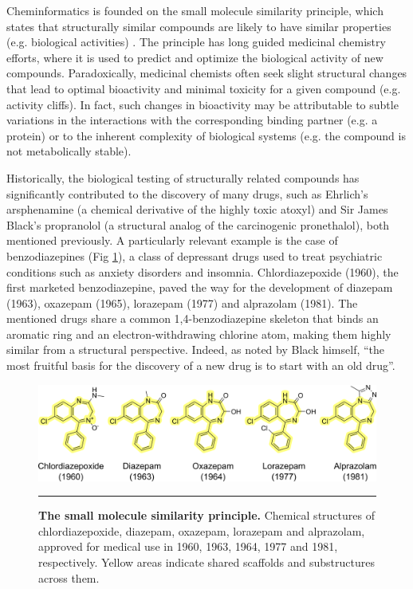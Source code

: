 Cheminformatics is founded on the small molecule similarity principle, which states that structurally similar compounds are likely to have similar properties (e.g. biological activities) \cite{johnson_concepts_1990}. The principle has long guided medicinal chemistry efforts, where it is used to predict and optimize the biological activity of new compounds. Paradoxically, medicinal chemists often seek slight structural changes that lead to optimal bioactivity and minimal toxicity for a given compound (e.g. activity cliffs). In fact, such changes in bioactivity may be attributable to subtle variations in the interactions with the corresponding binding partner (e.g. a protein) or to the inherent complexity of biological systems (e.g. the compound is not metabolically stable). 

Historically, the biological testing of structurally related compounds has significantly contributed to the discovery of many drugs, such as Ehrlich’s arsphenamine (a chemical derivative of the highly toxic atoxyl) and Sir James Black’s propranolol (a structural analog of the carcinogenic pronethalol), both mentioned previously. A particularly relevant example is the case of benzodiazepines (Fig \ref{Introduction_Fig1}), a class of depressant drugs used to treat psychiatric conditions such as anxiety disorders and insomnia. Chlordiazepoxide (1960), the first marketed benzodiazepine, paved the way for the development of diazepam (1963), oxazepam (1965), lorazepam (1977) and alprazolam (1981). The mentioned drugs share a common 1,4-benzodiazepine skeleton that binds an aromatic ring and an electron-withdrawing chlorine atom, making them highly similar from a structural perspective\cite{wick_history_2013, costa_clinical_1984}. Indeed, as noted by Black himself, “the most fruitful basis for the discovery of a new drug is to start with an old drug”\cite{pillaiyar_medicinal_2020, raju_nobel_2000}.

\begin{figure}[t!]
  \centering
  \includegraphics[width=\linewidth]{figures/Introduction/Benzodiazepines.png}
  \caption{
    \textbf{The small molecule similarity principle.} 
    Chemical structures of chlordiazepoxide, diazepam, oxazepam, lorazepam and alprazolam, approved for medical use in 1960, 1963, 1964, 1977 and 1981, respectively. Yellow areas indicate shared scaffolds and substructures across them.
  }
  \rule[0ex]{\textwidth}{0.5pt}
  \label{Introduction_Fig1}
\end{figure}


